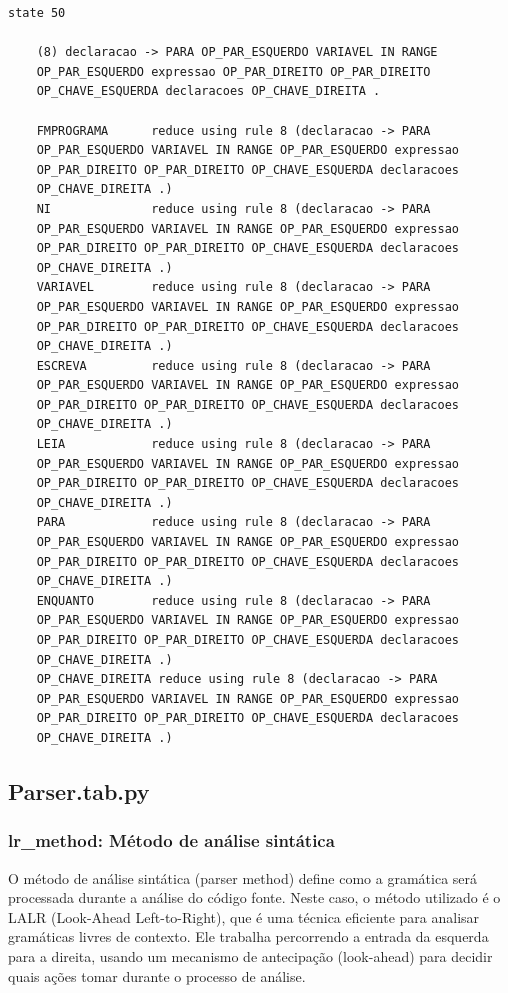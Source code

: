 \documentclass[a4paper,12pt]{article}
\begin{document}
\begin{verbatim}
state 50

    (8) declaracao -> PARA OP_PAR_ESQUERDO VARIAVEL IN RANGE 
    OP_PAR_ESQUERDO expressao OP_PAR_DIREITO OP_PAR_DIREITO 
    OP_CHAVE_ESQUERDA declaracoes OP_CHAVE_DIREITA .

    FMPROGRAMA      reduce using rule 8 (declaracao -> PARA 
    OP_PAR_ESQUERDO VARIAVEL IN RANGE OP_PAR_ESQUERDO expressao 
    OP_PAR_DIREITO OP_PAR_DIREITO OP_CHAVE_ESQUERDA declaracoes 
    OP_CHAVE_DIREITA .)
    NI              reduce using rule 8 (declaracao -> PARA 
    OP_PAR_ESQUERDO VARIAVEL IN RANGE OP_PAR_ESQUERDO expressao 
    OP_PAR_DIREITO OP_PAR_DIREITO OP_CHAVE_ESQUERDA declaracoes 
    OP_CHAVE_DIREITA .)
    VARIAVEL        reduce using rule 8 (declaracao -> PARA 
    OP_PAR_ESQUERDO VARIAVEL IN RANGE OP_PAR_ESQUERDO expressao 
    OP_PAR_DIREITO OP_PAR_DIREITO OP_CHAVE_ESQUERDA declaracoes 
    OP_CHAVE_DIREITA .)
    ESCREVA         reduce using rule 8 (declaracao -> PARA 
    OP_PAR_ESQUERDO VARIAVEL IN RANGE OP_PAR_ESQUERDO expressao 
    OP_PAR_DIREITO OP_PAR_DIREITO OP_CHAVE_ESQUERDA declaracoes 
    OP_CHAVE_DIREITA .)
    LEIA            reduce using rule 8 (declaracao -> PARA 
    OP_PAR_ESQUERDO VARIAVEL IN RANGE OP_PAR_ESQUERDO expressao 
    OP_PAR_DIREITO OP_PAR_DIREITO OP_CHAVE_ESQUERDA declaracoes 
    OP_CHAVE_DIREITA .)
    PARA            reduce using rule 8 (declaracao -> PARA 
    OP_PAR_ESQUERDO VARIAVEL IN RANGE OP_PAR_ESQUERDO expressao 
    OP_PAR_DIREITO OP_PAR_DIREITO OP_CHAVE_ESQUERDA declaracoes 
    OP_CHAVE_DIREITA .)
    ENQUANTO        reduce using rule 8 (declaracao -> PARA 
    OP_PAR_ESQUERDO VARIAVEL IN RANGE OP_PAR_ESQUERDO expressao 
    OP_PAR_DIREITO OP_PAR_DIREITO OP_CHAVE_ESQUERDA declaracoes 
    OP_CHAVE_DIREITA .)
    OP_CHAVE_DIREITA reduce using rule 8 (declaracao -> PARA 
    OP_PAR_ESQUERDO VARIAVEL IN RANGE OP_PAR_ESQUERDO expressao 
    OP_PAR_DIREITO OP_PAR_DIREITO OP_CHAVE_ESQUERDA declaracoes 
    OP_CHAVE_DIREITA .)

\end{verbatim}

\vspace{15 cm}
\subsection{Parser.tab.py}
\subsubsection{lr\_method: Método de análise sintática}
O método de análise sintática (parser method) define como a gramática 
será processada durante a análise do código fonte. Neste caso, o método 
utilizado é o LALR (Look-Ahead Left-to-Right), que é uma técnica 
eficiente para analisar gramáticas livres de contexto. Ele trabalha 
percorrendo a entrada da esquerda para a direita, usando um mecanismo de 
antecipação (look-ahead) para decidir quais ações tomar durante o 
processo de análise.
\end{document}
